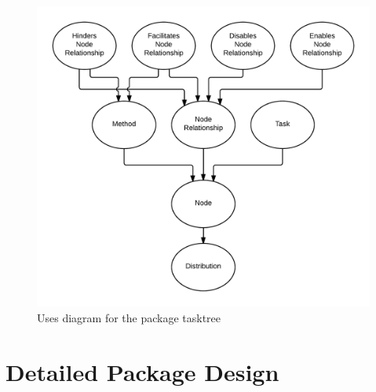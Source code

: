 \begin{enumerate}
\begin{itemize}
\begin{figure}[htb]
\centering
\includegraphics[width=4.5in]{figs/tasktree}
\caption{Uses diagram for the package tasktree}
\label{fig:tasktree}
\end{figure}


\end{itemize}

\end{enumerate}

\section{Detailed Package Design}

